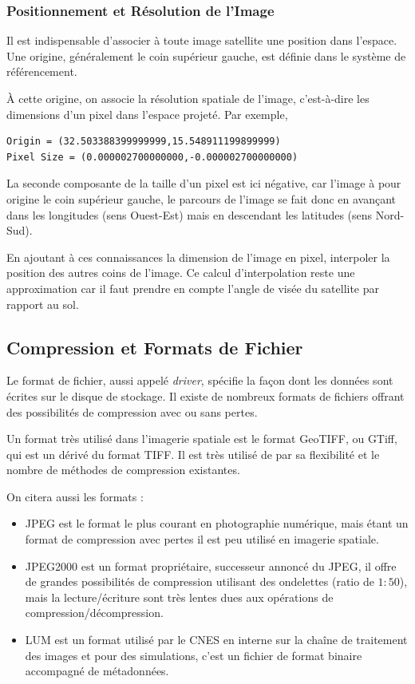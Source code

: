 \documentclass[a4paper, 10pt]{report}
\begin{document}
\subsubsection{Positionnement et Résolution de l'Image}
Il est indispensable d'associer à toute image satellite une position dans l'espace. Une origine, généralement le coin supérieur gauche, est définie dans le système de référencement.

À cette origine, on associe la résolution spatiale de l'image, c'est-à-dire les dimensions d'un pixel dans l'espace projeté.
Par exemple,
\begin{verbatim}
Origin = (32.503388399999999,15.548911199899999)
Pixel Size = (0.000002700000000,-0.000002700000000)
\end{verbatim}
La seconde composante de la taille d'un pixel est ici négative, car l'image à pour origine le coin supérieur gauche, le parcours de l'image se fait donc en avançant dans les longitudes (sens Ouest-Est) mais en descendant les latitudes (sens Nord-Sud).

En ajoutant à ces connaissances la dimension de l'image en pixel, interpoler la position des autres coins de l'image. Ce calcul d'interpolation reste une approximation car il faut prendre en compte l'angle de visée du satellite par rapport au sol.

\subsection{Compression et Formats de Fichier}
Le format de fichier, aussi appelé \emph{driver}, spécifie la façon dont les données sont écrites sur le disque de stockage.
Il existe de nombreux formats de fichiers offrant des possibilités de compression avec ou sans pertes.

Un format très utilisé dans l'imagerie spatiale est le format GeoTIFF, ou GTiff, qui est un dérivé du format TIFF. Il est très utilisé de par sa flexibilité et le nombre de méthodes de compression existantes.

On citera aussi les formats :
\begin{itemize}
	\item JPEG est le format le plus courant en photographie numérique, mais étant un format de compression avec pertes il est peu utilisé en imagerie spatiale.
	\item JPEG2000 est un format propriétaire, successeur annoncé du JPEG, il offre de grandes possibilités de compression utilisant des ondelettes (ratio de $1:50$), mais la lecture/écriture sont très lentes dues aux opérations de compression/décompression.
	\item LUM est un format utilisé par le CNES en interne sur la chaîne de traitement des images et pour des simulations, c'est un fichier de format binaire accompagné de métadonnées.
\end{itemize}
\end{document}
